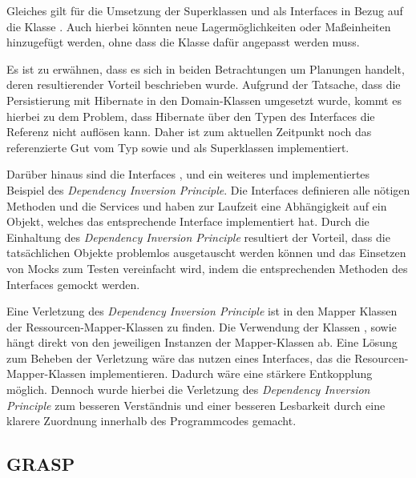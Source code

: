 Gleiches gilt für die Umsetzung der Superklassen \href{}{} und \href{}{} als Interfaces in Bezug auf die Klasse \href{}{}.
Auch hierbei könnten neue Lagermöglichkeiten oder Maßeinheiten hinzugefügt werden, ohne dass die Klasse \href{}{} dafür angepasst werden muss.

Es ist zu erwähnen, dass es sich in beiden Betrachtungen um Planungen handelt, deren resultierender Vorteil beschrieben wurde.
Aufgrund der Tatsache, dass die Persistierung mit Hibernate in den Domain-Klassen umgesetzt wurde, kommt es hierbei zu dem Problem, dass Hibernate über den Typen des Interfaces die Referenz nicht auflösen kann.
Daher ist zum aktuellen Zeitpunkt noch das referenzierte Gut vom Typ \href{}{} sowie \href{}{} und \href{}{} als Superklassen implementiert.

Darüber hinaus sind die Interfaces \href{}{}, \href{}{} und \href{}{} ein weiteres und implementiertes Beispiel des \textit{Dependency Inversion Principle}.
Die Interfaces definieren alle nötigen Methoden und die Services \href{}{} und \href{}{} haben zur Laufzeit eine Abhängigkeit auf ein Objekt, welches das entsprechende Interface implementiert hat.
Durch die Einhaltung des \textit{Dependency Inversion Principle} resultiert der Vorteil, dass die tatsächlichen Objekte problemlos ausgetauscht werden können und das Einsetzen von Mocks zum Testen vereinfacht wird, indem die entsprechenden Methoden des Interfaces gemockt werden.

Eine Verletzung des \textit{Dependency Inversion Principle} ist in den Mapper Klassen der Ressourcen-Mapper-Klassen zu finden. Die Verwendung der Klassen \href{}{}, \href{}{} sowie \href{}{} hängt direkt von den jeweiligen Instanzen der Mapper-Klassen ab.
Eine Lösung zum Beheben der Verletzung wäre das nutzen eines Interfaces, das die Resourcen-Mapper-Klassen implementieren.
Dadurch wäre eine stärkere Entkopplung möglich.
Dennoch wurde hierbei die Verletzung des \textit{Dependency Inversion Principle} zum besseren Verständnis und einer besseren Lesbarkeit durch eine klarere Zuordnung innerhalb des Programmcodes gemacht.

\subsection{\ac{GRASP}}

